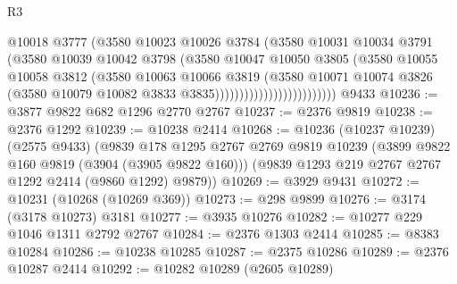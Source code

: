 \begin{lexlean}{R3}
\begin{coremodule}
                                      @10018
                                      @3777
                                      (@3580
                                        @10023
                                        @10026
                                        @3784
                                        (@3580
                                          @10031
                                          @10034
                                          @3791
                                          (@3580
                                            @10039
                                            @10042
                                            @3798
                                            (@3580
                                              @10047
                                              @10050
                                              @3805
                                              (@3580
                                                @10055
                                                @10058
                                                @3812
                                                (@3580
                                                  @10063
                                                  @10066
                                                  @3819
                                                  (@3580
                                                    @10071
                                                    @10074
                                                    @3826
                                                    (@3580
                                                      @10079
                                                      @10082
                                                      @3833
                                                      @3835)))))))))))))))))))))))))
    @9433
@10236 := @3877 @9822 @682 @1296 @2770 @2767
@10237 := @2376 @9819
@10238 := @2376 @1292
@10239 := @10238 @2414
@10268 := @10236
    (@10237 @10239)
    (@2575 @9433)
    (@9839
      @178
      @1295
      @2767
      @2769
      @9819
      @10239
      (@3899 @9822 @160 @9819 (@3904 (@3905 @9822 @160)))
      (@9839 @1293 @219 @2767 @2767 @1292 @2414 (@9860 @1292) @9879))
@10269 := @3929 @9431
@10272 := @10231 (@10268 (@10269 @369))
@10273 := @298 @9899
@10276 := @3174 (@3178 @10273) @3181
@10277 := @3935 @10276
@10282 := @10277 @229 @1046 @1311 @2792 @2767
@10284 := @2376 @1303 @2414
@10285 := @8383 @10284
@10286 := @10238 @10285
@10287 := @2375 @10286
@10289 := @2376 @10287 @2414
@10292 := @10282 @10289 (@2605 @10289)

\end{coremodule}
\end{lexlean}
